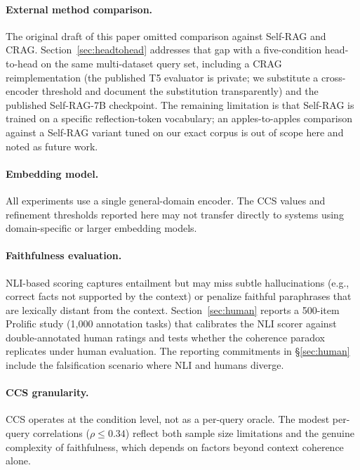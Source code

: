 \paragraph{External method comparison.} The original draft of this paper
omitted comparison against Self-RAG and CRAG. Section~\ref{sec:headtohead}
addresses that gap with a five-condition head-to-head on the same
multi-dataset query set, including a CRAG reimplementation (the published
T5 evaluator is private; we substitute a cross-encoder threshold and
document the substitution transparently) and the published Self-RAG-7B
checkpoint. The remaining limitation is that Self-RAG is trained on a
specific reflection-token vocabulary; an apples-to-apples comparison
against a Self-RAG variant tuned on our exact corpus is out of scope here
and noted as future work.

\paragraph{Embedding model.} All experiments use a single general-domain
encoder. The CCS values and refinement thresholds reported here may not
transfer directly to systems using domain-specific or larger embedding
models.

\paragraph{Faithfulness evaluation.} NLI-based scoring captures
entailment but may miss subtle hallucinations (e.g., correct facts not
supported by the context) or penalize faithful paraphrases that are
lexically distant from the context. Section~\ref{sec:human} reports a
500-item Prolific study (1{,}000 annotation tasks) that calibrates the
NLI scorer against double-annotated human ratings and tests whether the
coherence paradox replicates under human evaluation. The reporting
commitments in §\ref{sec:human} include the falsification scenario where
NLI and humans diverge.

\paragraph{CCS granularity.} CCS operates at the condition level, not as a
per-query oracle. The modest per-query correlations ($\rho \leq 0.34$)
reflect both sample size limitations and the genuine complexity of
faithfulness, which depends on factors beyond context coherence alone.

